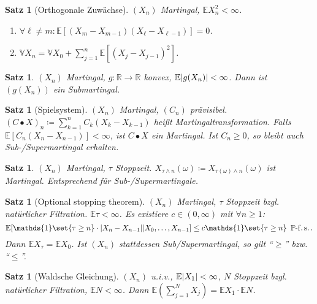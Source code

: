 \documentclass[a4paper,8pt]{article}
\theoremstyle{nonumberbreak}
\newtheorem{satz}[definition]{Satz}
\newcommand{\defas}{\coloneqq}
\newcommand{\ind}{\mathds{1}}
\renewcommand{\P}{\mathbb{P}}
\newcommand{\R}{\mathbb{R}}
\newcommand{\E}{\mathbb{E}}
\newcommand{\EV}[2]{\E[#1|#2]}
\newcommand{\V}{\mathbb{V}}
\newcommand{\fs}[1]{~\operatorname{#1-f.s.}}
\begin{document}
\begin{multicols}{3}
\begin{satz}[Orthogonale Zuwächse]
		$(X_n)$ Martingal, $\E X_n^2<\infty$.
		\begin{enumerate}[label=(\alph*)]
			\item $\forall \ell\neq m: \E[(X_m-X_{m-1})(X_\ell - X_{\ell - 1})] = 0$.
			\item $\V X_n =\V X_0 + \sum_{j=1}^n\E[(X_j - X_{j-1})^2]$.
		\end{enumerate}
	\end{satz}
	\begin{satz}
		$(X_n)$ Martingal, $g\colon\R\to\R$ konvex, $\E\abs{g(X_n)}<\infty$. Dann
		ist $(g(X_n))$ ein Submartingal.
	\end{satz}
	\begin{satz}[Spielsystem]
		$(X_n)$ Martingal, $(C_n)$ prävisibel. $(C\bullet X)_n\defas \sum_{k=1}^n C_k(X_k-X_{k-1})$
		heißt Martingaltransformation. Falls $\E[C_n(X_n-X_{n-1})] <\infty$, ist $C\bullet X$ ein
		Martingal. Ist $C_n\geq 0$, so bleibt auch Sub-/Supermartingal erhalten.
	\end{satz}
	\begin{satz}
		$(X_n)$ Martingal, $\tau$ Stoppzeit. $X_{\tau\wedge n}(\omega)\defas X_{\tau(\omega)\wedge n}(\omega)$
		ist Martingal. Entsprechend für Sub-/Supermartingale.
	\end{satz}
	\begin{satz}[Optional stopping theorem]
		$(X_n)$ Martingal, $\tau$ Stoppzeit bzgl. natürlicher Filtration. $\E\tau<\infty$.
		Es existiere $c\in(0,\infty)$ mit $\forall n\geq 1$:
		\[
			\EV{\ind\set{\tau\geq n}\cdot\abs{X_n-X_{n-1}}}{X_0,\ldots,X_{n-1}}\leq c\ind\set{\tau\geq n}\fs\P.
		\]
		Dann $\E X_\tau = \E X_0$. Ist $(X_n)$ stattdessen Sub/Supermartingal, so
		gilt \enquote{$\geq$} bzw. \enquote{$\leq$}.
	\end{satz}
	\begin{satz}[Waldsche Gleichung]
		$(X_n)$ u.i.v., $\E\abs{X_1}<\infty$, $N$ Stoppzeit bzgl. natürlicher Filtration,
		$\E N<\infty$. Dann $\E(\sum_{j=1}^N X_j) = \E X_1\cdot \E N$.
	\end{satz}
\end{multicols}
\vspace{0.2cm}
\end{document}
